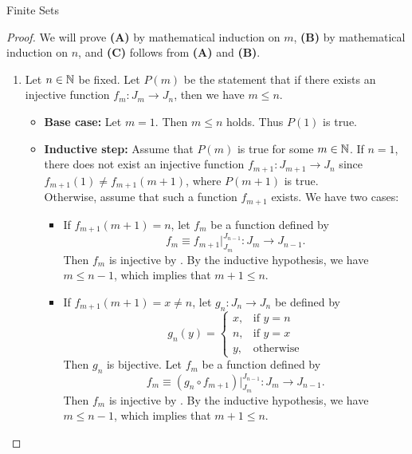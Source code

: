 \begin{section}{Finite Sets}
\begin{proof}
    We will prove \textbf{(A)} by mathematical induction on $m$, \textbf{(B)} by mathematical induction on $n$,
    and \textbf{(C)} follows from \textbf{(A)} and \textbf{(B)}.
    \begin{enumerate}[label=\textbf{(\Alph*)}]
        \item Let $n \in \mathbb{N}$ be fixed.
        Let $P(m)$ be the statement that if there exists an injective function
        $f_{m}: J_{m} \to J_{n}$, then we have $m \leq n$.
        \begin{itemize} 
            \item \textbf{Base case:} Let $m = 1$. Then $m \leq n$ holds. Thus $P(1)$ is true.
            \item \textbf{Inductive step:} Assume that $P(m)$ is true for some $m \in \mathbb{N}$.
            If $n = 1$, there does not exist an injective function $f_{m + 1}: J_{m + 1} \to J_{n}$
            since $f_{m+1}(1) \neq f_{m+1}(m + 1)$, where $P(m + 1)$ is true.
            \\[6mm]
            Otherwise, assume that such a function $f_{m+1}$ exists. We have two cases:
            \begin{itemize}
                \item If $f_{m+1}(m + 1) = n$, let $f_{m}$ be a function defined by
                \[
                f_{m} \equiv f_{m+1}|_{J_{m}}^{J_{n - 1}}: J_{m} \to J_{n - 1}.
                \]
                Then $f_{m}$ is injective by .
                By the inductive hypothesis, we have $m \leq n - 1$, which implies that $m + 1 \leq n$.
                \item If $f_{m+1}(m + 1) = x \neq n$, let $g_{n}: J_{n} \to J_{n}$ be defined by
                \[
                g_{n}(y) = \begin{cases}
                    x, & \text{if } y = n \\
                    n, & \text{if } y = x \\
                    y, & \text{otherwise}
                \end{cases}
                \]
                Then $g_{n}$ is bijective. Let $f_{m}$ be a function defined by
                \[
                f_{m} \equiv (g_{n} \circ f_{m+1})|_{J_{m}}^{J_{n - 1}}: J_{m} \to J_{n - 1}.
                \]
                Then $f_{m}$ is injective by .
                By the inductive hypothesis, we have $m \leq n - 1$, which implies that $m + 1 \leq n$.

\end{itemize}
\end{itemize}
\end{enumerate}
\end{proof}
\end{section}
